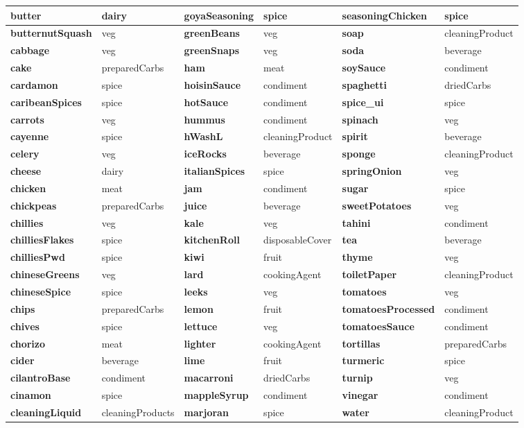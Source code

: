 \documentclass[]{article}
\begin{document}
\begin{table}
\begin{tabular}[t]{>{\bfseries}l|l|>{\bfseries}l|l|>{\bfseries}l|l}
\hline
butter & dairy & goyaSeasoning & spice & seasoningChicken & spice\\
\hline
butternutSquash & veg & greenBeans & veg & soap & cleaningProduct\\
\hline
cabbage & veg & greenSnaps & veg & soda & beverage\\
\hline
cake & preparedCarbs & ham & meat & soySauce & condiment\\
\hline
cardamon & spice & hoisinSauce & condiment & spaghetti & driedCarbs\\
\hline
caribeanSpices & spice & hotSauce & condiment & spice\_ui & spice\\
\hline
carrots & veg & hummus & condiment & spinach & veg\\
\hline
cayenne & spice & hWashL & cleaningProduct & spirit & beverage\\
\hline
celery & veg & iceRocks & beverage & sponge & cleaningProduct\\
\hline
cheese & dairy & italianSpices & spice & springOnion & veg\\
\hline
chicken & meat & jam & condiment & sugar & spice\\
\hline
chickpeas & preparedCarbs & juice & beverage & sweetPotatoes & veg\\
\hline
chillies & veg & kale & veg & tahini & condiment\\
\hline
chilliesFlakes & spice & kitchenRoll & disposableCover & tea & beverage\\
\hline
chilliesPwd & spice & kiwi & fruit & thyme & veg\\
\hline
chineseGreens & veg & lard & cookingAgent & toiletPaper & cleaningProduct\\
\hline
chineseSpice & spice & leeks & veg & tomatoes & veg\\
\hline
chips & preparedCarbs & lemon & fruit & tomatoesProcessed & condiment\\
\hline
chives & spice & lettuce & veg & tomatoesSauce & condiment\\
\hline
chorizo & meat & lighter & cookingAgent & tortillas & preparedCarbs\\
\hline
cider & beverage & lime & fruit & turmeric & spice\\
\hline
cilantroBase & condiment & macarroni & driedCarbs & turnip & veg\\
\hline
cinamon & spice & mappleSyrup & condiment & vinegar & condiment\\
\hline
cleaningLiquid & cleaningProducts & marjoran & spice & water & cleaningProduct\\

\end{tabular}
\end{table}
\end{document}
